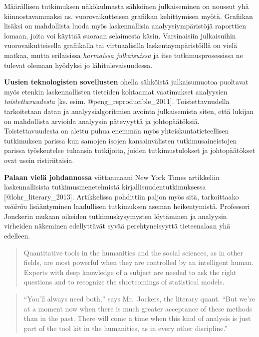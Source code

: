 Määrällisen tutkimuksen näkökulmasta sähköinen julkaiseminen on noussut
yhä kiinnostavammaksi ns. vuorovaikutteisen grafiikan kehittymisen
myötä. Grafiikan lisäksi on mahdollista luoda myös laskennallisia
analyysiympäristöjä raporttien lomaan, joita voi käyttää suoraan
selaimesta käsin. Varsinaisiin julkaisuihin vuorovaikutteisella
grafiikalla tai virtuaalisilla laskentaympäristöillä on vielä matkaa,
mutta erilaisissa \emph{harmaissa julkaisuissa} ja itse
tutkimusprosessissa ne tulevat olemaan hyödyksi jo lähitulevaisuudessa.

\textbf{Uusien teknologisten sovellusten} ohella sähköistä
julkaisumuotoa puoltavat myös etenkin laskennallisten tieteiden
kohtaamat vaatimukset analyysien \emph{toistettavuudesta} {[}ks. esim.
@peng\_reproducible\_2011{]}. Toistettavuudella tarkoitetaan datan ja
analyysialgoritmien avointa julkaisemista siten, että lukijan on
mahdollista arvioida analyysin pätevyyttä ja johtopäätöksiä.
Toistettavuudesta on alettu puhua enemmän myös yhteiskuntatieteellisen
tutkimuksen parissa kun samojen isojen kansainvälisten
tutkimusaineistojen parissa työskentelee tuhansia tutkijoita, joiden
tutkimustulokset ja johtopäätökset ovat usein ristiriitaisia.

\textbf{Palaan vielä johdannossa} viittaamaani New York Times
artikkeliin laskennallisista tutkimusmenetelmistä
kirjallisuudentutkimuksessa {[}@lohr\_literary\_2013{]}. Artikkelissa
pohdittiin paljon myös sitä, tarkoittaako \emph{määrän} lisääntyminen
laadullisen tutkimuksen aseman heikentymistä. Professori Jonckerin
mukaan oikeiden tutkimuskysymysten löytäminen ja analyysin virheiden
näkeminen edellyttävät syvää perehtyneisyyttä tieteenalaan yhä edelleen.

\begin{quote}
Quantitative tools in the humanities and the social sciences, as in
other fields, are most powerful when they are controlled by an
intelligent human. Experts with deep knowledge of a subject are needed
to ask the right questions and to recognize the shortcomings of
statistical models.
\end{quote}

\begin{quote}
``You'll always need both,'' says Mr.~Jockers, the literary quant. ``But
we're at a moment now when there is much greater acceptance of these
methods than in the past. There will come a time when this kind of
analysis is just part of the tool kit in the humanities, as in every
other discipline.''
\end{quote}

